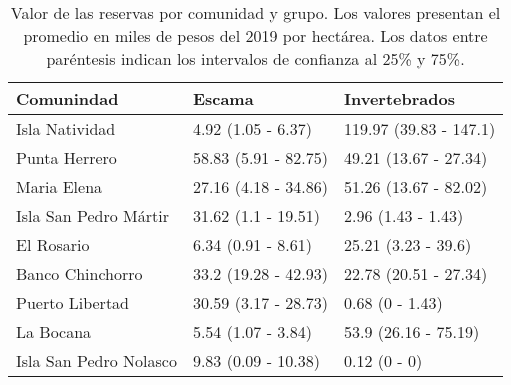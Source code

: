 \begin{table}[!h]

\caption{\label{tab:tot_val}Valor de las reservas por comunidad y grupo. Los valores presentan el promedio en miles de pesos del 2019 por hectárea. Los datos entre paréntesis indican los intervalos de confianza al 25\% y 75\%.}
\centering
\begin{tabular}[t]{lll}
\toprule
Comunindad & Escama & Invertebrados\\
\midrule
Isla Natividad & 4.92 (1.05 - 6.37) & 119.97 (39.83 - 147.1)\\
Punta Herrero & 58.83 (5.91 - 82.75) & 49.21 (13.67 - 27.34)\\
Maria Elena & 27.16 (4.18 - 34.86) & 51.26 (13.67 - 82.02)\\
Isla San Pedro Mártir & 31.62 (1.1 - 19.51) & 2.96 (1.43 - 1.43)\\
El Rosario & 6.34 (0.91 - 8.61) & 25.21 (3.23 - 39.6)\\
\addlinespace
Banco Chinchorro & 33.2 (19.28 - 42.93) & 22.78 (20.51 - 27.34)\\
Puerto Libertad & 30.59 (3.17 - 28.73) & 0.68 (0 - 1.43)\\
La Bocana & 5.54 (1.07 - 3.84) & 53.9 (26.16 - 75.19)\\
Isla San Pedro Nolasco & 9.83 (0.09 - 10.38) & 0.12 (0 - 0)\\
\bottomrule
\end{tabular}
\end{table}